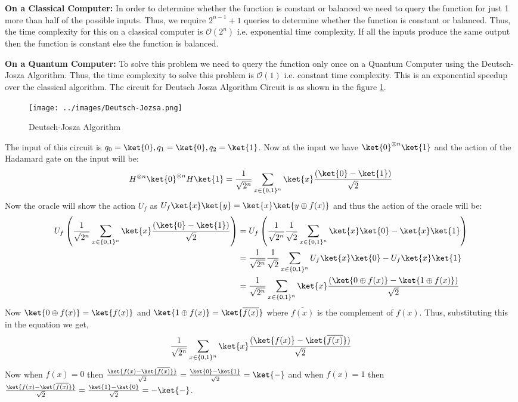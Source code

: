\documentclass[12pt, oneside]{book}
\theoremstyle{definition}
\theoremstyle{definition}
\theoremstyle{remark}
\begin{document}
\textbf{On a Classical Computer: }In order to determine whether the function is constant or balanced we need to query the function
for just 1 more than half of the possible inputs. Thus, we require $2^{n-1}+1$ queries to determine whether the function is constant or balanced.
Thus, the time complexity for this on a classical computer is $\mathcal{O}(2^n)$ i.e. exponential time complexity. If all the inputs produce the same output then the function is constant else the function is balanced.

\textbf{On a Quantum Computer: }To solve this problem we need to query the function only once on a Quantum Computer using the Deutsch-Josza Algorithm.
Thus, the time complexity to solve this problem is $\mathcal{O}(1)$ i.e. constant time complexity. This is an exponential speedup over the classical algorithm. The circuit for 
Deutsch Josza Algorithm Circuit is as shown in the figure \ref{fig:deutsch-jozsa}.
\begin{figure}[H]
    \centering
    \texttt{[image: ../images/Deutsch-Jozsa.png]}
    \caption{Deutsch-Josza Algorithm}
    \label{fig:deutsch-jozsa}
\end{figure}
The input of this circuit is $q_0=\ket{0},q_1=\ket{0},q_2=\ket{1}$.
Now at the input we have $\ket{0}^{\otimes n}\ket{1}$ and the action of the Hadamard gate on the input will be:
\[
    H^{\otimes n}\ket{0}^{\otimes n}H\ket{1}=\frac{1}{\sqrt{2^n}}\sum_{x \in \{0,1\}^n}\ket{x}\frac{(\ket{0}-\ket{1})}{\sqrt{2}}
\]
Now the oracle will show the action $U_f$ as $U_f\ket{x}\ket{y}=\ket{x}\ket{y \oplus f(x)}$ and thus the action of the oracle will be:
\begin{align*}
    U_f\left(\frac{1}{\sqrt{2^n}}\sum_{x \in \{0,1\}^n}\ket{x}\frac{(\ket{0}-\ket{1})}{\sqrt{2}}\right)&=U_f\left(\frac{1}{\sqrt{2^n}}\frac{1}{\sqrt{2}}\sum_{x \in \{0,1\}^n}\ket{x}\ket{0}-\ket{x}\ket{1}\right)\\
    &=\frac{1}{\sqrt{2^n}}\frac{1}{\sqrt{2}}\sum_{x \in \{0,1\}^n}U_f\ket{x}\ket{0}-U_f\ket{x}\ket{1}\\
    &=\frac{1}{\sqrt{2^n}}\sum_{x \in \{0,1\}^n}\ket{x}\frac{(\ket{0 \oplus f(x)}-\ket{1\oplus f(x)})}{\sqrt{2}}
\end{align*}
Now $\ket{0 \oplus f(x)}=\ket{f(x)}$ and $\ket{1 \oplus f(x)} = \ket{\overline{f(x)}}$ where $\overline{f(x)}$ is the complement of $f(x)$. Thus, substituting this in the equation we get,
\[
    \frac{1}{\sqrt{2^n}}\sum_{x \in \{0,1\}^n}\ket{x}\frac{(\ket{f(x)}-\ket{\overline{f(x)}})}{\sqrt{2}}
\] 
Now when $f(x)=0$ then $\frac{\ket{f(x)-\ket{\overline{f(x)}}}}{\sqrt{2}}=\frac{\ket{0}-\ket{1}}{\sqrt{2}}=\ket{-}$ and when $f(x)=1$ then $\frac{\ket{f(x)-\ket{\overline{f(x)}}}}{\sqrt{2}}=\frac{\ket{1}-\ket{0}}{\sqrt{2}}=-\ket{-}$.
\end{document}
